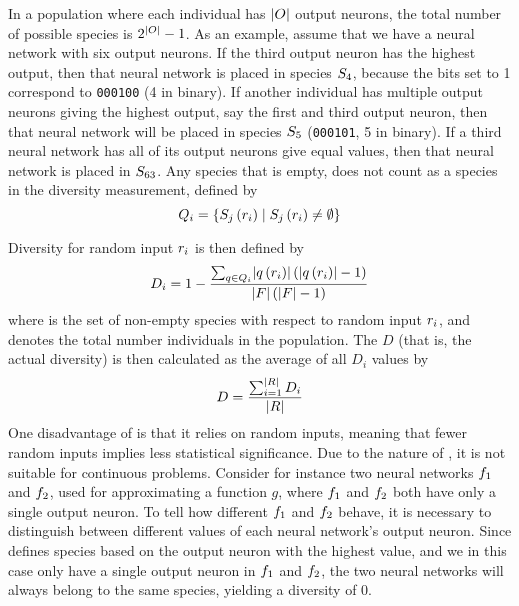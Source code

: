 In a population where each individual has $\lvert O\rvert$ output neurons, the total number of possible species is $2^{\lvert O\rvert} - 1$.  As an example, assume that we have a neural network with six output neurons. If the third output neuron has the highest output, then that neural network is placed in species $S_4$, because the bits set to 1 correspond to \texttt{000100} (4 in binary). If another individual has multiple output neurons giving the highest output, say the first and third output neuron, then that neural network will be placed in species $S_5$ (\texttt{000101}, 5 in binary). If a third neural network has all of its output neurons give equal values, then that neural network is placed in $S_{63}$. Any species that is empty, does not count as a species in the diversity measurement, defined by
\begin{equation*}\label{eq:nonemptyspecies}
  Q_{i} = \left\{ S_{j}\left(r_i\right) \mid S_{j}\left(r_i\right) \neq \emptyset \right\}
\end{equation*}

Diversity for random input $r_i$ is then defined by
%
\begin{equation*}\label{eq:sdi}
  D_i = 1 - \frac{\sum_{q \in Q_{i}}\lvert q\left(r_i\right)\rvert\left(\lvert q\left(r_i\right)\rvert - 1\right)}{\lvert F\rvert\left(\lvert F\rvert - 1\right)}
\end{equation*}
%
where  is the set of non-empty species with respect to random input $r_i$, and \indset{} denotes the total number individuals in the population. The \dia{} $D$ (that is, the actual diversity) is then calculated as the average of all \ransetl{} $D_i$ values by
%
\[
  D =\frac{\sum_{i=1}^{\lvert R\rvert}{D_i}}{\lvert R\rvert}
\]
%
One disadvantage of \dia{} is that it relies on random inputs, meaning that fewer random inputs implies less statistical significance. Due to the nature of \dia, it is not suitable for continuous problems. Consider for instance two neural networks $f_1$ and $f_2$, used for approximating a function $g$, where $f_1$ and $f_2$ both have only a single output neuron. To tell how different $f_1$ and $f_2$ behave, it is necessary to distinguish between different values of each neural network's output neuron. Since \dia{} defines species based on the output neuron with the highest value, and we in this case only have a single output neuron in $f_1$ and $f_2$, the two neural networks will always belong to the same species, yielding a diversity of 0.  
